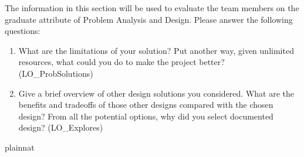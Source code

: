 \documentclass[12pt, titlepage]{article}
\begin{document}
The information in this section will be used to evaluate the team members on the
graduate attribute of Problem Analysis and Design.  Please answer the following questions:

\begin{enumerate}
  \item What are the limitations of your solution?  Put another way, given
  unlimited resources, what could you do to make the project better? (LO\_ProbSolutions)
  \item Give a brief overview of other design solutions you considered.  What
  are the benefits and tradeoffs of those other designs compared with the chosen
  design?  From all the potential options, why did you select documented design?
  (LO\_Explores)
\end{enumerate}

 {plainnat}


\newpage{}
\end{document}
